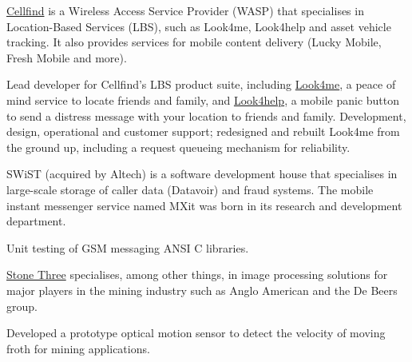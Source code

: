 \documentclass[10pt,a4paper,final]{columncv}
\begin{document}
\noindent \href{http://www.cellfind.co.za/}{Cellfind} is a Wireless Access Service Provider (WASP)
that specialises in Location-Based Services (LBS), such as Look4me, Look4help and asset vehicle
tracking. It also provides services for mobile content delivery (Lucky Mobile, Fresh Mobile and more).
\begin{cvenv}
         {Lead developer for Cellfind's LBS product suite, including
         \href{http://www.look4me.co.za/}{Look4me}, a peace of mind
         service to locate friends and family, and
         \href{http://www.look4help.co.za/}{Look4help}, a mobile panic
         button to send a distress message with your location to friends and family.}
         {Development, design, operational and customer support; redesigned and rebuilt Look4me
          from the ground up, including a request queueing mechanism for reliability.}
\end{cvenv}


\noindent SWiST (acquired by Altech) is a software development house that specialises in large-scale storage of
caller data (Datavoir) and fraud systems. The mobile instant messenger service named MXit was
born in its research and development department.
\begin{cvenv}
         {Unit testing of GSM messaging ANSI C libraries.}
\end{cvenv}

\noindent \href{http://www.stonethree.com/}{Stone Three} specialises, among other things, in image processing solutions
for major players in the mining industry such as Anglo American and the De Beers group.
\begin{cvenv}
         {Developed a prototype optical motion sensor to detect the velocity of moving froth for mining applications.}
\end{cvenv}
\end{document}
